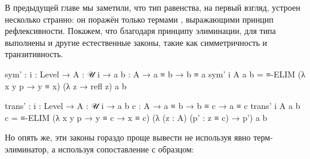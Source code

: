 \documentclass{article}[12pt]
\begin{document}
В предыдущей главе мы заметили, что тип равенства, на первый взгляд, устроен несколько странно:
он поражён только термами , выражающими принцип рефлексивности.
Покажем, что благодаря принципу элиминации, для типа  выполнены и другие
естественные законы, такие как симметричность и транзитивность.
\begin{code}
sym' : {i : Level} → {A : 𝒰 i} → {a b : A} → a ≡ b → b ≡ a
sym' {i} {A} {a} {b} = ≡-ELIM (λ x y p → y ≡ x) (λ z → refl z) a b

trans' : {i : Level} → {A : 𝒰 i} → {a b c : A}
        → a ≡ b → b ≡ c → a ≡ c
trans' {i} {A} {a} {b} {c} = ≡-ELIM (λ x y p → y ≡ c → x ≡ c) 
                                   (λ (z : A) (p' : z ≡ c) → p') a b
\end{code}
Но опять же, эти законы гораздо проще вывести не используя явно терм-элиминатор,
а используя сопоставление с образцом:
\end{document}

